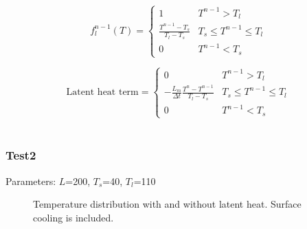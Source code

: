 \documentclass[a4paper,12pt]{article}
\begin{document}
\begin{equation}
f_l^{n-1}(T) =
\left\{
\begin{array}{cc}
1 & T^{n-1}>T_l \\
\frac{T^{n-1}-T_s}{T_l - T_s} & T_s \leq T^{n-1} \leq T_l \\
0 & T^{n-1} < T_s
\end{array}
\right.
\end{equation}


\begin{equation}
\text{Latent heat term}=
\left\{
\begin{array}{cc}
0 & T^{n-1}>T_l \\
-\frac{L_m}{\Delta t}\frac{T^{n}-T^{n-1}}{T_l - T_s} & T_s \leq T^{n-1} \leq T_l \\
0 & T^{n-1} < T_s
\end{array}
\right.
\end{equation}
\\
\subsubsection{Test2}
Parameters: $L$=200, $T_s$=40, $T_l$=110\\

\begin{figure}[!ht]
     \hfill
     \caption{Temperature distribution with and without latent heat. Surface cooling is included.}
     \label{fig:temp}
   \end{figure}
\end{document}
